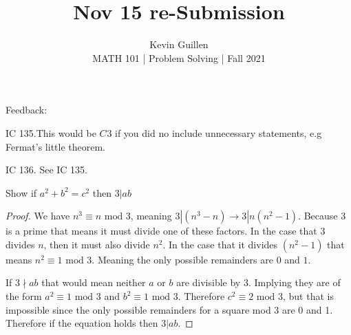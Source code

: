 \documentclass[11pt]{article}
\newenvironment{problem}[2][Problem\!]{\begin{trivlist}
\item[\hskip \labelsep {\bfseries #1}\hskip \labelsep {\bfseries #2}]}{\end{trivlist}}
\begin{document}
 
\title{Nov 15 re-Submission}
\author{Kevin Guillen\\[0.5em]
MATH 101 | Problem Solving | Fall 2021}
\date{} 
\maketitle

Feedback:

IC 135.This would be $C^{}3$ if you did no include unnecessary statements, e.g
Fermat’s little theorem.

IC 136. See IC 135.

\begin{tcolorbox}
  \begin{problem} {IC | 11/10 | 135.} Show if $a^{2} + b^{2} = c^{2}$ then $3| ab$
  \end{problem}
\end{tcolorbox}
\begin{proof}
  We have $n^{3} \equiv n \text{ mod }3$, meaning $3|(n^{3}-n)\rightarrow 3|n(n^{2}-1)$. Because 3 is a prime that means it must divide one of these factors. In the case that 3 divides $n$, then it must also divide $n^{2}$. In the case that it divides $(n^{2}-1)$ that means $n^{2}\equiv 1 \text{ mod }3$. Meaning the only possible remainders are $0$ and $1$. 

  If $3 \nmid ab$ that would mean neither $a$ or $b$ are divisible by $3$. Implying they are of the form $a^{2} \equiv 1\text{ mod }3$ and $b^{2} \equiv 1\text{ mod }3$. Therefore $c^{2} \equiv 2 \text{ mod } 3$, but that is impossible since the only possible remainders for a square mod 3 are 0 and 1. Therefore if the equation holds then $3|ab$.
\end{proof}
\end{document}
